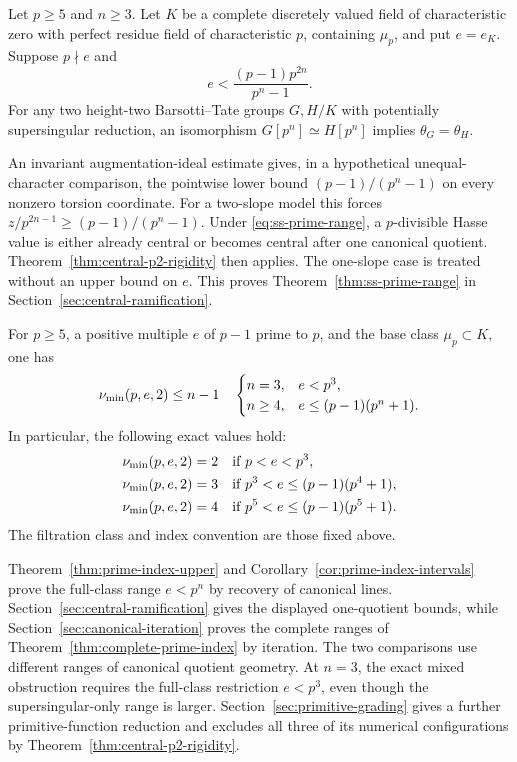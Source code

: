 \begin{theorem}\label{thm:ss-prime-range}
Let $p\ge5$ and $n\ge3$. Let $K$ be a complete discretely valued field of characteristic zero with perfect residue field of characteristic $p$, containing $\mu_p$, and put $e=e_K$. Suppose $p\nmid e$ and
\begin{equation}\label{eq:ss-prime-range}
 e<\frac{(p-1)p^{2n}}{p^n-1}.
\end{equation}
For any two height-two Barsotti--Tate groups $G,H/K$ with potentially supersingular reduction, an isomorphism $G[p^n]\simeq H[p^n]$ implies $\theta_G=\theta_H$.
\end{theorem}

An invariant augmentation-ideal estimate gives, in a hypothetical unequal-character comparison, the pointwise lower bound $(p-1)/(p^n-1)$ on every nonzero torsion coordinate. For a two-slope model this forces $z/p^{2n-1}\ge(p-1)/(p^n-1)$. Under \eqref{eq:ss-prime-range}, a $p$-divisible Hasse value is either already central or becomes central after one canonical quotient. Theorem~\ref{thm:central-p2-rigidity} then applies. The one-slope case is treated without an upper bound on $e$. This proves Theorem~\ref{thm:ss-prime-range} in Section~\ref{sec:central-ramification}.

\begin{corollary}\label{cor:prime-recovery-intro}
For $p\ge5$, a positive multiple $e$ of $p-1$ prime to $p$, and the base class $\mu_p\subset K$, one has
\[
 \nu_{\min}(p,e,2)\le n-1
 \quad\begin{cases}
 n=3,&e<p^3,\\
 n\ge4,&e\le(p-1)(p^n+1).
 \end{cases}
\]
In particular, the following exact values hold:
\begin{align*}
 \nu_{\min}(p,e,2)&=2&&\text{if }p<e<p^3,\\
 \nu_{\min}(p,e,2)&=3&&\text{if }p^3<e\le(p-1)(p^4+1),\\
 \nu_{\min}(p,e,2)&=4&&\text{if }p^5<e\le(p-1)(p^5+1).
\end{align*}
The filtration class and index convention are those fixed above.
\end{corollary}

Theorem~\ref{thm:prime-index-upper} and Corollary~\ref{cor:prime-index-intervals} prove the full-class range $e<p^n$ by recovery of canonical lines. Section~\ref{sec:central-ramification} gives the displayed one-quotient bounds, while Section~\ref{sec:canonical-iteration} proves the complete ranges of Theorem~\ref{thm:complete-prime-index} by iteration. The two comparisons use different ranges of canonical quotient geometry. At $n=3$, the exact mixed obstruction requires the full-class restriction $e<p^3$, even though the supersingular-only range is larger. Section~\ref{sec:primitive-grading} gives a further primitive-function reduction and excludes all three of its numerical configurations by Theorem~\ref{thm:central-p2-rigidity}.

